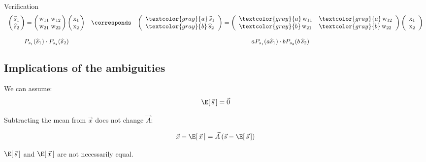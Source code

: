 \begin{frame}{Verification}
{\footnotesize
\begin{equation}
	\begin{array}{ccc}
	\arraycolsep=1.4pt
	\left( \begin{array}{ll}
		\widehat{s}_1 \\ \widehat{s}_2
	\end{array} \right)
	=
	\left( \begin{array}{ll}
		\mathrm{w}_{11} & \mathrm{w}_{12} \\
		\mathrm{w}_{21} & \mathrm{w}_{22} 
	\end{array} \right)
	\left( \begin{array}{ll}
		\mathrm{x}_1 \\ \mathrm{x}_2
	\end{array} \right)
	& \corresponds &
	\left( \begin{array}{ll}
		\textcolor{gray}{a}\,\widehat{s}_1 \\ 
                 \textcolor{gray}{b}\,\widehat{s}_2
	\end{array} \right)
	=
	\left( \begin{array}{ll}
		\textcolor{gray}{a}\,\mathrm{w}_{11} & \textcolor{gray}{a}\,\mathrm{w}_{12} \\
		\textcolor{gray}{b}\,\mathrm{w}_{21} & \textcolor{gray}{b}\,\mathrm{w}_{22} 
	\end{array} \right)
	\left( \begin{array}{ll}
		\mathrm{x}_1 \\ \mathrm{x}_2
	\end{array} \right)
	\\\\
	P_{s_1} (\widehat{s}_1) \cdot P_{s_2} (\widehat{s}_2)
	&& 
	aP_{s_1} (a\widehat{s}_1) \cdot bP_{s_2} (b\, \widehat{s}_2)
	\end{array}
\end{equation}
}
\end{frame}

\subsection{Implications of the ambiguities}

\begin{frame}{\subsecname}

We can assume:
\begin{equation}
\E \lbrack \, \vec s \, \rbrack = \vec 0
\end{equation}

Subtracting the mean from $\vec x$ does not change $\vec A$:

\begin{equation}
\vec x - \E \lbrack \, \vec x \, \rbrack = \vec A \left( \vec s - \E \lbrack \, \vec s \, \rbrack \right)
\end{equation}

 $\E \lbrack \, \vec s \, \rbrack$ and $\E \lbrack \, \vec x \, \rbrack$ are not necessarily equal.

\end{frame}

